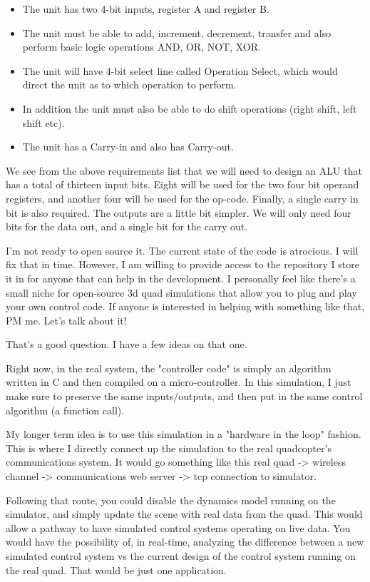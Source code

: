 \documentclass{article}
\begin{document}
\begin{itemize}
   \item The unit has two 4-bit inputs, register A and register B. 
   \item The unit must be able to add, increment, decrement, transfer and also perform basic logic operations AND, OR, NOT, XOR. 
   \item The unit will have 4-bit select line called Operation Select, which would direct the unit as to which operation to perform. 
   \item In addition the unit must also be able to do shift operations (right shift, left shift etc). 
   \item The unit has a Carry-in and also has Carry-out. 
\end{itemize}

We see from the above requirements list that we will need to design an ALU that has a total of thirteen
input bits. Eight will be used for the two four bit operand registers, and another four will be used for
the op-code. Finally, a single carry in bit is also required. The outputs are a little bit simpler. We will only need four bits for the data out, and a single bit for the carry out.

\newpage

I'm not ready to open source it. The current state of the code is atrocious. I will fix that in time. However, I am willing to provide access to the repository I store it in for anyone that can help in the development. I personally feel like there's a small niche for open-source 3d quad simulations that allow you to plug and play your own control code. If anyone is interested in helping with something like that, PM me. Let's talk about it!

That's a good question. I have a few ideas on that one. 

Right now, in the real system, the "controller code" is simply an algorithm written in C and then compiled on a micro-controller. In this simulation, I just make sure to preserve the same inputs/outputs, and then put in the same control algorithm (a function call).

My longer term idea is to use this simulation in a "hardware in the loop" fashion. This is where I directly connect up the simulation to the real quadcopter's communications system. It would go something like this real quad -> wireless channel -> communications web server -> tcp connection to simulator. 

Following that route, you could disable the dynamics model running on the simulator, and simply update the scene with real data from the quad. This would allow a pathway to have simulated control systems operating on live data. You would have the possibility of, in real-time, analyzing the difference between a new simulated control system vs the current design of the control system running on the real quad. That would be just one application.
\end{document}
